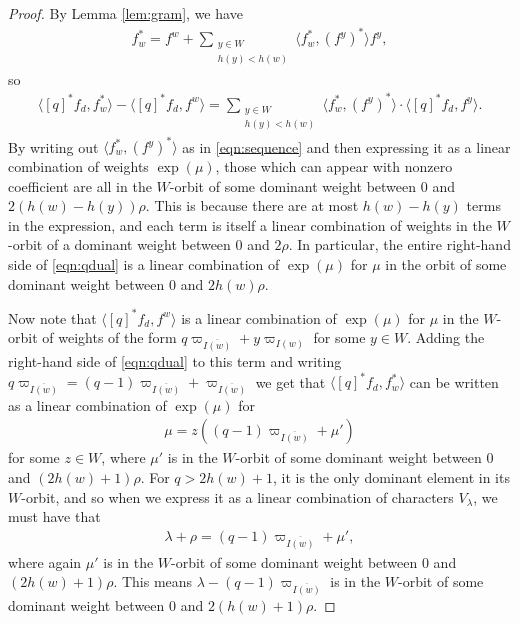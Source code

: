 \documentclass{amsart}
\theoremstyle{definition}
\begin{document}
\begin{proof}
By Lemma \ref{lem:gram},  we have
\begin{align}
    f_w^* = f^w + \sum_{\substack{y\in W\\ h(y) < h(w)}} \langle f_w^*, (f^y)^*\rangle f^y,
\end{align}
so 
\begin{align}
    \langle [q]^*f_d, f_w^*\rangle - \langle [q]^*f_d, f^w\rangle = \sum_{\substack{y\in W\\ h(y) < h(w)}} \langle f_w^*, (f^y)^*\rangle \cdot \langle [q]^*f_d, f^y\rangle.\label{eqn:qdual}
\end{align}
By writing out $\langle f_w^*, (f^y)^*\rangle$ as in \eqref{eqn:sequence} and then expressing it as a linear combination of weights $\exp(\mu)$, those which can appear with nonzero coefficient are all in the $W$-orbit of some dominant weight between $0$ and $2(h(w) - h(y))\rho$. This is because there are at most $h(w) - h(y)$ terms in the expression, and each term is itself a linear combination of weights in the $W$-orbit of a dominant weight between $0$ and $2\rho$. In particular, the entire right-hand side of \eqref{eqn:qdual} is a linear combination of $\exp(\mu)$ for $\mu$ in the orbit of some dominant weight between $0$ and $2h(w)\rho$.

Now note that $\langle [q]^*f_d, f^w\rangle$ is a linear combination of $\exp(\mu)$ for $\mu$ in the $W$-orbit of weights of the form $q\varpi_{\overline{I(w)}} + y\varpi_{I(w)}$  for some $y \in W$. Adding the right-hand side of \eqref{eqn:qdual} to this term and writing $q\varpi_{\overline{I(w)}} = (q-1)\varpi_{\overline{I(w)}} + \varpi_{\overline{I(w)}}$ we get that $\langle [q]^*f_d, f_w^*\rangle$ can be written as a linear combination of $\exp(\mu)$ for
\begin{align}
    \mu  = z((q-1)\varpi_{\overline{I(w)}} + \mu')
\end{align}
for some $z \in W$, where $\mu'$ is in the $W$-orbit of some dominant weight between $0$ and $(2h(w) + 1)\rho$. For $q > 2h(w) + 1$, it is the only dominant element in its $W$-orbit, and so when we express it as a linear combination of characters $V_{\lambda}$, we must have that 
\begin{align}
    \lambda + \rho = (q - 1)\varpi_{\overline{I(w)}} + \mu',
\end{align}
where again $\mu'$ is in the $W$-orbit of some dominant weight between $0$ and $(2h(w) + 1)\rho$. This means $\lambda - (q - 1)\varpi_{\overline{I(w)}}$ is in the $W$-orbit of some dominant weight between $0$ and $2(h(w) + 1)\rho$.
\end{proof}
\end{document}
